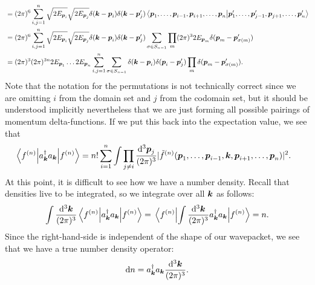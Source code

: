 {\begin{align}
    &= (2 \pi)^{6} \sum_{i,j=1}^{n} \sqrt{2 E_{\vb*{p}_{i}}} \sqrt{2 E_{\vb*{p}_{j}}} \delta(\vb*{k} - \vb*{p}_{i}) \delta(\vb*{k} - \vb*{p}_{j}') \ip{\vb*{p}_{1},\ldots,\vb*{p}_{i-1},\vb*{p}_{i+1},\ldots,\vb*{p}_{n}}{\vb*{p}_{1}',\ldots,\vb*{p}_{j-1}',\vb*{p}_{j+1},\ldots,\vb*{p}_{n}'} \nonumber \\
    &= (2 \pi)^{6} \sum_{i,j=1}^{n} \sqrt{2 E_{\vb*{p}_{i}}} \sqrt{2 E_{\vb*{p}_{j}}} \delta(\vb*{k} - \vb*{p}_{i}) \delta(\vb*{k} - \vb*{p}_{j}') \sum_{\sigma \in S_{n-1}} \prod_{m} (2 \pi)^3 2 E_{\vb*{p}_{m}} \delta(\vb*{p}_{m} - \vb*{p}_{\sigma(m)}') \nonumber \\
    &= (2 \pi)^3 (2 \pi)^{3n} 2 E_{\vb*{p}_{1}} \ldots 2 E_{\vb*{p}_{n}} \sum_{i,j=1}^{n} \sum_{\sigma \in S_{n-1}} \delta(\vb*{k} - \vb*{p}_{i}) \delta(\vb*{p}_{i} - \vb*{p}_{j}') \prod_{m} \delta(\vb*{p}_{m} - \vb*{p}_{\sigma(m)}')
.\end{align}
Note that the notation for the permutations is not technically correct since we are omitting $i$ from the domain set and $j$ from the codomain set, but it should be understood implicitly nevertheless that we are just forming all possible pairings of momentum delta-functions.
If we put this back into the expectation value, we see that
\begin{align}
    \mel{f^{(n)}}{a_{\vb*{k}}^{\dagger} a_{\vb*{k}}}{f^{(n)}} &= n! \sum_{i=1}^{n} \int \prod_{j \ne i} \frac{\dd[3]{\vb*{p}_{j}}}{(2 \pi)^{3}} | \tilde{f}^{(n)}(\vb*{p}_{1},\ldots,\vb*{p}_{i-1},\vb*{k},\vb*{p}_{i+1},\ldots,\vb*{p}_{n})|^2
.\end{align}
At this point, it is difficult to see how we have a number density.
Recall that densities live to be integrated, so we integrate over all $\vb*{k}$ as follows:
\begin{align}
    \int \frac{\dd[3]{\vb*{k}}}{(2 \pi)^3} \mel{f^{(n)}}{a_{\vb*{k}}^{\dagger} a_{\vb*{k}}}{f^{(n)}}  = \mel{f^{(n)}}{ \int \frac{\dd[3]{\vb*{k}}}{(2 \pi)^3} a_{\vb*{k}}^{\dagger} a_{\vb*{k}} }{f^{(n)}} = n
.\end{align}
Since the right-hand-side is independent of the shape of our wavepacket, we see that we have a true number density operator:
\begin{align}
    \dd{n} = a_{\vb*{k}}^{\dagger} a_{\vb*{k}} \frac{\dd[3]{\vb*{k}}}{(2 \pi)^3}
.\end{align}



}


